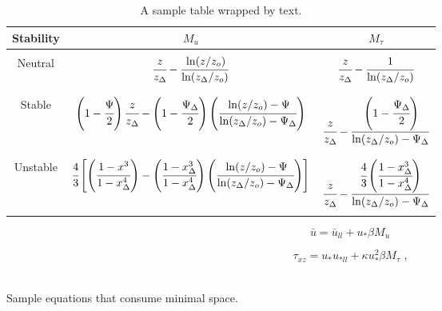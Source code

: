 \begin{wraptable}[15]{r}[0.01in]{4.3in}
\caption{A sample table wrapped by text.}
\begin{center}
\vspace{-10pt}
\scriptsize
\begin{tabular}{  c  c  c  }
\hline
\hline
Stability & $M_u$ & $M_{\tau}$ \\ 
\hline\hline\\
Neutral & $\cfrac{z}{z_\Delta} - \cfrac{\ln(z/z_o)}{\ln(z_\Delta/z_o)}$ & $\cfrac{z}{z_\Delta} - \cfrac{1}{\ln(z_\Delta/z_o)}$\\\\
\hline \\
Stable & $\left(1 - \cfrac{\Psi}{2}\right)\cfrac{z}{z_\Delta} - \left(1 - \cfrac{\Psi_\Delta}{2}\right)
\left(\cfrac{\ln(z/z_o)-\Psi}{\ln(z_\Delta/z_o)- \Psi_\Delta}\right)$ & $\cfrac{z}{z_\Delta} - \cfrac{\left(1 - \cfrac{\Psi_\Delta}{2}\right)}{\ln(z_\Delta/z_o) - \Psi_\Delta}$\\\\
\hline \\
Unstable & $\cfrac{4}{3}\left[\left(\cfrac{1-x^3}{1-x_{\Delta}^{4}}\right) -  \left(\cfrac{1-x_{\Delta}^3}{1 - x_{\Delta}^{4}}\right)\left(\cfrac{\ln(z/z_o)-\Psi}{\ln(z_\Delta/z_o)- \Psi_\Delta}\right)\right]$ & $\cfrac{z}{z_\Delta} - \cfrac{\cfrac{4}{3}\left(\cfrac{1-x_{\Delta}^3}{1 - x_{\Delta}^{4}}\right)}{\ln(z_\Delta/z_o) - \Psi_\Delta}$\\\\
\hline
\hline
\end{tabular}
\end{center}
\label{table1}
\end{wraptable}

\begin{center}
\begin{minipage}{.3\textwidth}
\begin{equation}
 \bar u = \bar u_{ll} + u_* \beta M_{u} \label{new_u}
\end{equation}
\end{minipage}
\begin{minipage}{.36\linewidth}
\begin{equation}
  \tau_{xz} = u_* u_{*ll} + \kappa u_*^2 \beta M_{\tau} \label{new_tau} \mbox{ ,}
\end{equation}
\end{minipage}
~\\Sample equations that consume minimal space.
\end{center}

